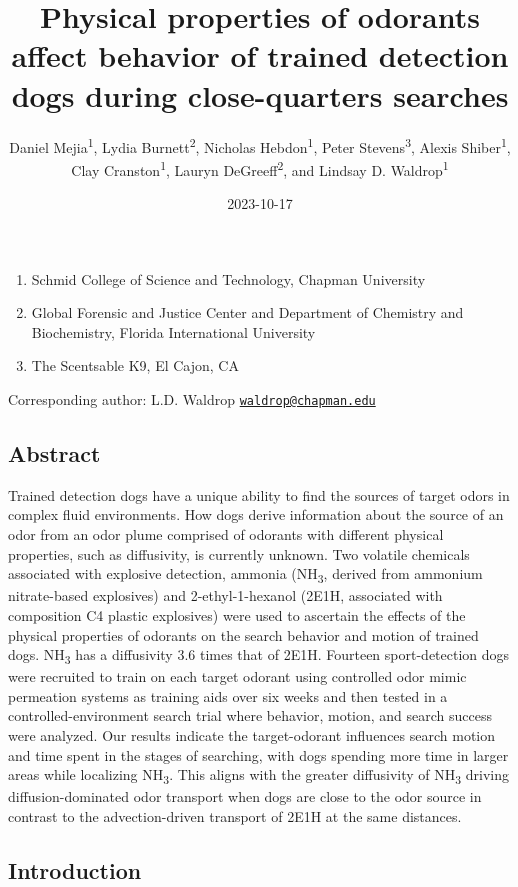 \documentclass[
]{article}
\title{Physical properties of odorants affect behavior of trained detection dogs during close-quarters searches}
\author{Daniel Mejia\textsuperscript{1}, Lydia Burnett\textsuperscript{2}, Nicholas Hebdon\textsuperscript{1}, Peter Stevens\textsuperscript{3}, Alexis Shiber\textsuperscript{1}, Clay Cranston\textsuperscript{1}, Lauryn DeGreeff\textsuperscript{2}, and Lindsay D. Waldrop\textsuperscript{1}}
\date{2023-10-17}
\providecommand{\tightlist}{%
  \setlength{\itemsep}{0pt}\setlength{\parskip}{0pt}}
\begin{document}
\maketitle

\begin{enumerate}
\def\labelenumi{\arabic{enumi}.}
\tightlist
\item
  Schmid College of Science and Technology, Chapman University
\item
  Global Forensic and Justice Center and Department of Chemistry and Biochemistry, Florida International University
\item
  The Scentsable K9, El Cajon, CA
\end{enumerate}

Corresponding author: L.D. Waldrop \href{mailto:waldrop@chapman.edu}{\nolinkurl{waldrop@chapman.edu}}

\hypertarget{abstract}{%
\subsection{Abstract}\label{abstract}}

Trained detection dogs have a unique ability to find the sources of target odors in complex fluid environments. How dogs derive information about the source of an odor from an odor plume comprised of odorants with different physical properties, such as diffusivity, is currently unknown. Two volatile chemicals associated with explosive detection, ammonia (NH\textsubscript{3}, derived from ammonium nitrate-based explosives) and 2-ethyl-1-hexanol (2E1H, associated with composition C4 plastic explosives) were used to ascertain the effects of the physical properties of odorants on the search behavior and motion of trained dogs. NH\textsubscript{3} has a diffusivity 3.6 times that of 2E1H. Fourteen sport-detection dogs were recruited to train on each target odorant using controlled odor mimic permeation systems as training aids over six weeks and then tested in a controlled-environment search trial where behavior, motion, and search success were analyzed. Our results indicate the target-odorant influences search motion and time spent in the stages of searching, with dogs spending more time in larger areas while localizing NH\textsubscript{3}. This aligns with the greater diffusivity of NH\textsubscript{3} driving diffusion-dominated odor transport when dogs are close to the odor source in contrast to the advection-driven transport of 2E1H at the same distances.

\hypertarget{introduction}{%
\subsection{Introduction}\label{introduction}}
\end{document}
